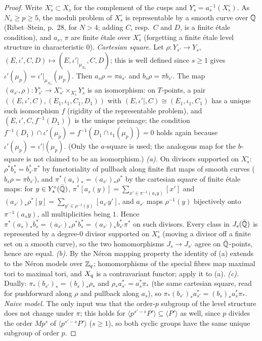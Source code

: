 \begin{proof}
Write $X^\circ_s\subset X_s$ for the complement of the cusps and $Y^\circ_s=a_s^{-1}(X^\circ_s)$. As $N_s\ge p\ge5$, the moduli problem of $X^\circ_s$ is
representable by a smooth curve over $\mathbb{Q}$ (Ribet--Stein, p.~28, for $N>4$; adding $C$, resp.\ $C$ and $D$, is a finite étale condition), and
$a_s$, $\pi$ are finite étale over $X^\circ_s$ (forgetting a finite étale level structure in characteristic $0$).
\emph{Cartesian square.} Let $\rho:Y_{s'}\to Y_s$, $(E,\iota',C,D)\mapsto(E,\iota'|_{\mu_{N_s}},C,D)$; this is well defined since $s\ge1$ gives
$\iota'(\mu_p)=\iota'|_{\mu_{N_s}}(\mu_p)$. Then $a_s\rho=\pi a_{s'}$ and $b_s\rho=\pi b_{s'}$. The map $(a_{s'},\rho):Y^\circ_{s'}\to X^\circ_{s'}\times_{X^\circ_s}Y^\circ_s$
is an isomorphism: on $T$-points, a pair $((E,\iota',C),(E_1,\iota_1,C_1,D_1))$ with $(E,\iota'|,C)\cong(E_1,\iota_1,C_1)$ has a unique such
isomorphism $f$ (rigidity of the representable problem), and $(E,\iota',C,f^{-1}(D_1))$ is the unique preimage; the condition
$f^{-1}(D_1)\cap\iota'(\mu_p)=f^{-1}(D_1\cap\iota_1(\mu_p))=0$ holds again because $\iota'(\mu_p)=\iota'|(\mu_p)$. (Only the $a$-square is used; the analogous map for the $b$-square is not claimed to be an isomorphism.)
\emph{(a).} On divisors supported on $X^\circ_s$: $\rho^*b_s^*=b_{s'}^*\pi^*$ by functoriality of pullback along finite flat maps of smooth
curves ($b_s\rho=\pi b_{s'}$), and $\pi^*(a_s)_*=(a_{s'})_*\rho^*$ by the cartesian square of finite étale maps: for $y\in Y^\circ_s(\bar{\mathbb{Q}})$,
$\pi^*[a_s(y)]=\sum_{x'\in\pi^{-1}(a_sy)}[x']$ and $(a_{s'})_*\rho^*[y]=\sum_{y'\in\rho^{-1}(y)}[a_{s'}y']$, and $a_{s'}$ maps $\rho^{-1}(y)$ bijectively onto
$\pi^{-1}(a_sy)$, all multiplicities being $1$. Hence $\pi^*(a_s)_*b_s^*=(a_{s'})_*\rho^*b_s^*=(a_{s'})_*b_{s'}^*\pi^*$ on such divisors. Every class in
$J_s(\bar{\mathbb{Q}})$ is represented by a degree-$0$ divisor supported on $X^\circ_s$ (moving a divisor off a finite set on a smooth curve), so the
two homomorphisms $J_s\to J_{s'}$ agree on $\bar{\mathbb{Q}}$-points, hence are equal.
\emph{(b).} By the Néron mapping property the identity of (a) extends to the Néron models over $\mathbb{Z}_q$; homomorphisms of the special
fibres map maximal tori to maximal tori, and $X_q$ is a contravariant functor; apply it to (a).
\emph{(c).} Dually: $\pi_*(b_{s'})_*=(b_s)_*\rho_*$ and $\rho_*a_{s'}^*=a_s^*\pi_*$ (the same cartesian square, read for pushforward along $\rho$
and pullback along $a_s$), so $\pi_*(b_{s'})_*a_{s'}^*=(b_s)_*a_s^*\pi_*$.
\emph{Naive model.} The only input was that the order-$p$ subgroup of the level structure does not change under $\pi$; this holds for
$\langle p^{s'-s}P'\rangle\subseteq\langle P'\rangle$ as well, since $p$ divides the order $Mp^s$ of $\langle p^{s'-s}P'\rangle$ ($s\ge1$), so both cyclic groups
have the same unique subgroup of order $p$.
\end{proof}

